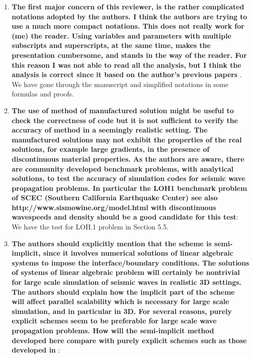 \documentclass[twoside,11pt]{article}
\begin{document}
\begin{enumerate}
\item \textbf{The first major concern of this reviewer, is the rather complicated notations adopted by the authors. I think the authors are trying to use a much more compact notations. This does not really work for (me) the reader. Using variables and parameters with multiple subscripts and superscripts, at the same time, makes the presentation cumbersome, and stands in the way of the reader. For this reason I was not able to read all the analysis, but I think the analysis is correct since it based on the author’s previous papers} \cite{petersson2009stable,wang2019fourth,petersson2015wave}.\\
 We have gone through the manuscript and simplified notations in some formulas and proofs.

\item  \textbf{The use of method of manufactured solution might be useful to check the correctness of code but it is not sufficient to verify the accuracy of method in a seemingly realistic setting. The manufactured solutions may not exhibit the properties of the real solutions, for example large gradients, in the presence of discontinuous material properties. As the authors are aware, there are community developed benchmark problems, with analytical solutions, to test the accuracy of simulation codes for seismic wave propagation problems. In particular the LOH1 benchmark problem of SCEC (Southern California Earthquake Center) see also http://www.sismowine.org/model.html with discontinuous wavespeeds and density should be a good candidate for this test}: We have the test for LOH.1 problem in Section 5.5.

\item  \textbf{The authors should explicitly mention that the scheme is semi-implicit, since it involves numerical solutions of linear algebraic systems to impose the interface/boundary conditions. The solutions of systems of linear algebraic problem will certainly be nontrivial for large scale simulation of seismic waves in realistic 3D settings. The authors should explain how the implicit part of the scheme will affect parallel scalability which is necessary for large scale simulation, and in particular in 3D. For several reasons, purely explicit schemes seem to be preferable for large scale wave propagation problems. How will the semi-implicit method developed here compare with purely explicit schemes such as those developed in} \cite{virta2014acoustic,duru2014stable}: 


\end{enumerate}
\end{document}
